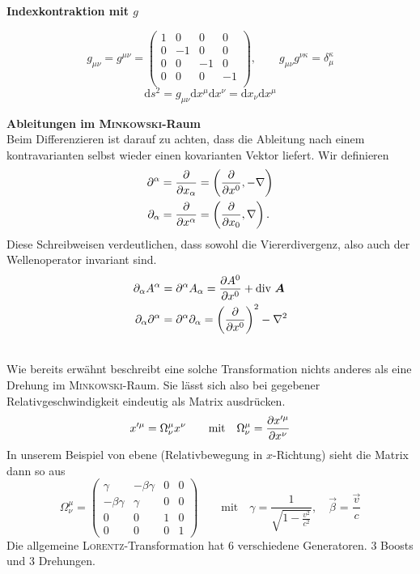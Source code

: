 \textbf{Indexkontraktion mit $g$}

\begin{equation*}
g_{\mu\nu}=g^{\mu\nu}=\begin{pmatrix}
1 & 0& 0 & 0 \\
0 &-1& 0 & 0\\
0 & 0 & -1 & 0 \\
0 & 0 & 0 & -1 \\
\end{pmatrix}, \qquad g_{\mu\nu}g^{\nu\kappa}=\delta_\mu^\kappa
\end{equation*}
\begin{equation*}
\mathrm{d}s^2 = g_{\mu\nu}\mathrm{d}x^\mu\mathrm{d}x^\nu=\mathrm{d}x_\nu\mathrm{d}x^\mu
\end{equation*}

\newpage
\textbf{Ableitungen im \textsc{Minkowski}-Raum}\\

Beim Differenzieren ist darauf zu achten, dass die Ableitung nach einem kontravarianten selbst wieder einen kovarianten Vektor liefert. Wir definieren
\begin{align*}
\partial^\alpha &= \frac{\partial{}}{\partial{x_\alpha}}=\left(\frac{\partial{}}{\partial{x^0}},-\nabla\right)\\
\partial_\alpha &= \frac{\partial{}}{\partial{x^\alpha}}=\left(\frac{\partial{}}{\partial{x_0}},\nabla\right).
\end{align*}
Diese Schreibweisen verdeutlichen, dass sowohl die Viererdivergenz, also auch der Wellenoperator invariant sind.
\begin{align*}
\partial_\alpha A^\alpha &= \partial^\alpha A_\alpha =\frac{\partial{A^0}}{\partial{x^0}}+\text{div }\bm{A}\\
\partial_\alpha\partial^\alpha&=\partial^\alpha\partial_\alpha = \left(\frac{\partial{}}{\partial{x^0}}\right)^2-\nabla^2
\end{align*}

\\

Wie bereits erwähnt beschreibt eine solche Transformation nichts anderes als eine Drehung im \textsc{Minkowski}-Raum. Sie lässt sich also bei gegebener Relativgeschwindigkeit eindeutig als Matrix ausdrücken.
\begin{equation*}
x'^\mu = \Omega_\nu^\mu x^\nu \qquad \text{mit}\quad \Omega_\nu^\mu = \frac{\partial{x'^\mu}}{\partial{x^\nu}}
\end{equation*}
In unserem Beispiel von ebene (Relativbewegung in $x$-Richtung) sieht die Matrix dann so aus
\begin{equation*}
\Omega_\nu^\mu = \begin{pmatrix}
\gamma &-\beta\gamma & 0 & 0 \\
-\beta\gamma & \gamma & 0 & 0 \\
0 & 0 & 1 & 0\\
0 & 0 & 0 & 1
\end{pmatrix}  \qquad \text{mit}\quad \gamma=\frac{1}{\sqrt{1-\frac{v^2}{c^2}}}, \quad \vec{\beta} = \frac{\vec{v}}{c}
\end{equation*}
Die allgemeine \textsc{Lorentz}-Transformation hat 6 verschiedene Generatoren. 3 Boosts und 3 Drehungen.
\newpage
